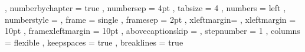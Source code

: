 {%
,   numberbychapter  = true
,   numbersep        =  4pt
,   tabsize          =  4
,   numbers          = left
,   numberstyle      = \tiny\color{msvc_linenumber}\noncopynumber
,   frame            = single
,   framesep         =  2pt
,   xleftmargin=\parindent
,   xleftmargin      = 10pt
,   framexleftmargin = 10pt
,   abovecaptionskip = \medskipamount
,   stepnumber       = 1
,   columns          = flexible
,   keepspaces       = true
,   breaklines       = true
}
